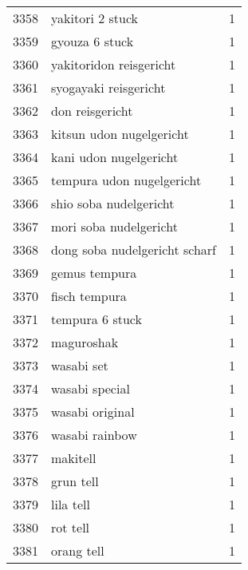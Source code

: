 \begin{tabular}{llr}
3358 &                                   yakitori 2 stuck &      1 \\
3359 &                                     gyouza 6 stuck &      1 \\
3360 &                            yakitoridon reisgericht &      1 \\
3361 &                              syogayaki reisgericht &      1 \\
3362 &                                    don reisgericht &      1 \\
3363 &                           kitsun udon nugelgericht &      1 \\
3364 &                             kani udon nugelgericht &      1 \\
3365 &                          tempura udon nugelgericht &      1 \\
3366 &                             shio soba nudelgericht &      1 \\
3367 &                             mori soba nudelgericht &      1 \\
3368 &                      dong soba nudelgericht scharf &      1 \\
3369 &                                      gemus tempura &      1 \\
3370 &                                      fisch tempura &      1 \\
3371 &                                    tempura 6 stuck &      1 \\
3372 &                                         maguroshak &      1 \\
3373 &                                         wasabi set &      1 \\
3374 &                                     wasabi special &      1 \\
3375 &                                    wasabi original &      1 \\
3376 &                                     wasabi rainbow &      1 \\
3377 &                                           makitell &      1 \\
3378 &                                          grun tell &      1 \\
3379 &                                          lila tell &      1 \\
3380 &                                           rot tell &      1 \\
3381 &                                         orang tell &      1 \\

\end{tabular}
